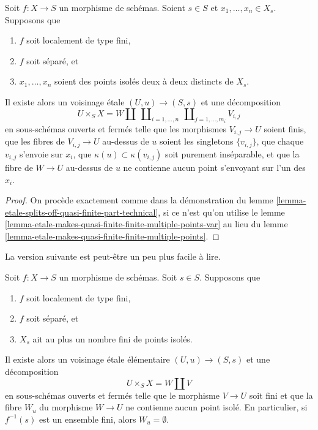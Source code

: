 \begin{lemma}
\label{lemma-etale-splits-off-quasi-finite-part-technical-variant}
Soit $f : X \to S$ un morphisme de schémas.
Soient $s \in S$ et $x_1, \ldots, x_n \in X_s$. Supposons que
\begin{enumerate}
\item $f$ soit localement de type fini,
\item $f$ soit séparé, et
\item $x_1, \ldots, x_n$ soient des points isolés deux à deux distincts de $X_s$.
\end{enumerate}
Il existe alors un voisinage \'etale $(U, u) \to (S, s)$
et une décomposition
$$
U \times_S X =
W \amalg
\ \coprod\nolimits_{i = 1, \ldots, n}
\ \coprod\nolimits_{j = 1, \ldots, m_i}
V_{i, j}
$$
en sous-schémas ouverts et fermés telle que les morphismes
$V_{i, j} \to U$ soient finis, que les fibres de $V_{i, j} \to U$ au-dessus de $u$ soient
les singletons $\{v_{i, j}\}$, que chaque $v_{i, j}$ s'envoie sur $x_i$,
que $\kappa(u) \subset \kappa(v_{i, j})$ soit purement inséparable,
et que la fibre de $W \to U$ au-dessus de $u$ ne contienne aucun point s'envoyant
sur l'un des $x_i$.
\end{lemma}

\begin{proof}
On procède exactement comme dans la démonstration du
lemme \ref{lemma-etale-splits-off-quasi-finite-part-technical}, si ce n'est qu'on
utilise le lemme \ref{lemma-etale-makes-quasi-finite-finite-multiple-points-var}
au lieu du lemme \ref{lemma-etale-makes-quasi-finite-finite-multiple-points}.
\end{proof}

\noindent
La version suivante est peut-être un peu plus facile à lire.

\begin{lemma}
\label{lemma-etale-splits-off-quasi-finite-part}
Soit $f : X \to S$ un morphisme de schémas.
Soit $s \in S$. Supposons que
\begin{enumerate}
\item $f$ soit localement de type fini,
\item $f$ soit séparé, et
\item $X_s$ ait au plus un nombre fini de points isolés.
\end{enumerate}
Il existe alors un voisinage \'etale élémentaire $(U, u) \to (S, s)$
et une décomposition
$$
U \times_S X = W \amalg V
$$
en sous-schémas ouverts et fermés telle que le morphisme
$V \to U$ soit fini et que la fibre $W_u$ du
morphisme $W \to U$ ne contienne aucun point isolé.
En particulier, si $f^{-1}(s)$ est un ensemble fini, alors $W_u = \emptyset$.
\end{lemma}

